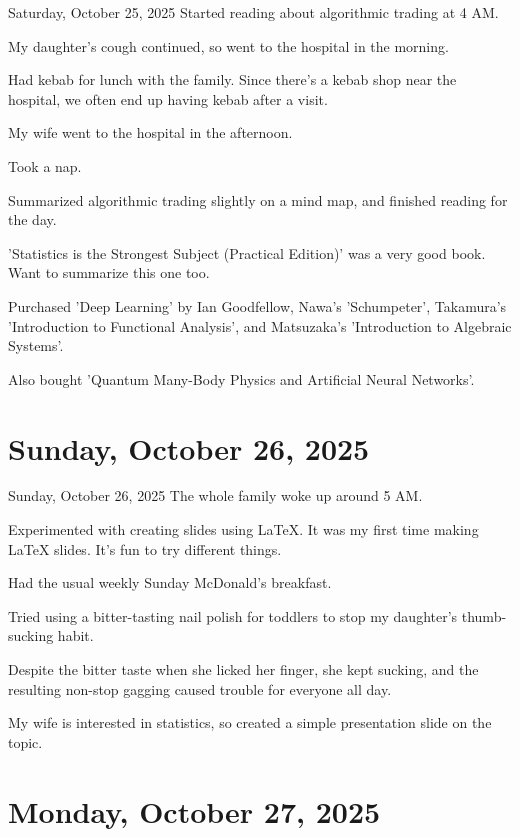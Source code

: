 \documentclass[dvipdfmx, autodetect-engine, aspectratio=169, 10.5pt]{beamer}
\begin{document}
\begin{frame}{Saturday, October 25, 2025}
	Started reading about algorithmic trading at 4 AM.

	My daughter's cough continued, so went to the hospital in the morning.

	Had kebab for lunch with the family.
	Since there's a kebab shop near the hospital, we often end up having kebab after a visit.

	My wife went to the hospital in the afternoon.

	Took a nap.

	Summarized algorithmic trading slightly on a mind map, and finished reading for the day.

	'Statistics is the Strongest Subject (Practical Edition)' was a very good book.
	Want to summarize this one too.

	Purchased 'Deep Learning' by Ian Goodfellow, Nawa's 'Schumpeter', Takamura's 'Introduction to Functional Analysis', and Matsuzaka's 'Introduction to Algebraic Systems'.

	Also bought 'Quantum Many-Body Physics and Artificial Neural Networks'.
\end{frame}

\section{Sunday, October 26, 2025}

\begin{frame}{Sunday, October 26, 2025}
	The whole family woke up around 5 AM.

	Experimented with creating slides using LaTeX.
	It was my first time making LaTeX slides.
	It's fun to try different things.

	Had the usual weekly Sunday McDonald's breakfast.

	Tried using a bitter-tasting nail polish for toddlers to stop my daughter's thumb-sucking habit.

	Despite the bitter taste when she licked her finger, she kept sucking, and the resulting non-stop gagging caused trouble for everyone all day.

	My wife is interested in statistics, so created a simple presentation slide on the topic.
\end{frame}

\section{Monday, October 27, 2025}
\end{document}
